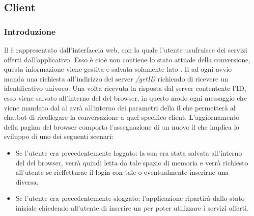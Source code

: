 \subsection{Client}
\subsubsection{Introduzione}
Il  è rappresentato dall'interfaccia web, con la quale l'utente usufruisce dei servizi offerti dall'applicativo. Esso è  cioè non contiene lo stato attuale della conversione, questa informazione viene gestita e salvata solamente lato . \newline
Il  ad ogni avvio manda una richiesta  all'indirizzo del server \textit{/getID} richiendo di ricevere un identificativo univoco. Una volta ricevuta la risposta dal server contentente l'ID, esso viene salvato all'interno del  del browser, in questo modo ogni messaggio che viene mandato dal  al  avrà all'interno dei parametri della  il  che permetterà al chatbot di ricollegare la conversazione a quel specifico client. \newline
L'aggiornamento della pagina del browser comporta l'assegnazione di un nuovo  il che implica lo sviluppo di uno dei seguenti scenari:
\begin{itemize}
    \item Se l'utente era precedentemente loggato: la sua  era stata salvata all'interno del  del browser, verrà quindi letta da tale spazio di memoria e verrà richiesto all'utente se rieffetturae il login con tale  o eventualmente inserirne una diversa. 
    \item Se l'utente era precedentemente sloggato: l'applicazione ripartirà dallo stato iniziale chiedendo all'utente di inserire un  per poter utilizzare i servizi offerti. 
\end{itemize}

